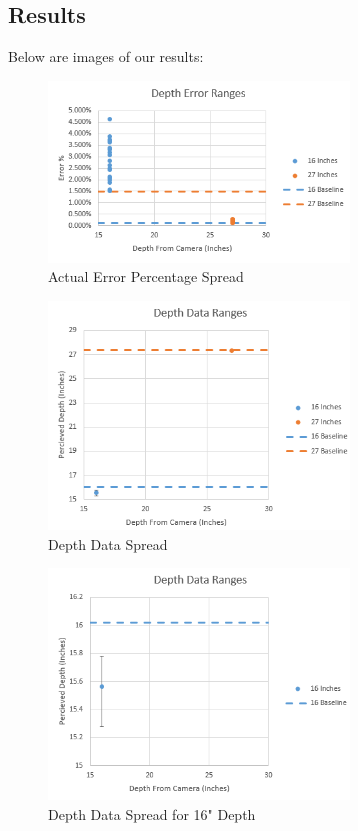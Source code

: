 \documentclass{article}
\begin{document}
		\newpage
		\subsection{Results}
			Below are images of our results:
			
			\begin{figure}[h]
				\includegraphics[width=8cm]{./images/part_2/error_ranges_raw.png}
				\centering
				\caption{Actual Error Percentage Spread}
				\label{fig:p2_results_err_actual}
			\end{figure}
			
			\begin{figure}[h]
				\includegraphics[width=8cm]{./images/part_2/error_ranges_all.png}
				\centering
				\caption{Depth Data Spread}
				\label{fig:p2_results_depth_actual}
			\end{figure}
		
			\newpage
			\begin{figure}[h]
				\includegraphics[width=8cm]{./images/part_2/error_range_16.png}
				\centering
				\caption{Depth Data Spread for 16" Depth}
				\label{fig:p2_results_depth_16}
			\end{figure}
			
\end{document}
